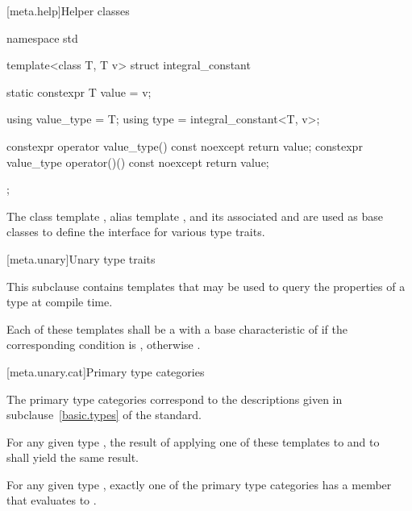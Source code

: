 [meta.help]{Helper classes}

%
\begin{indexed}{}
\begin{codeblock}
namespace std {
  template<class T, T v> struct integral_constant {
    static constexpr T value = v;

    using value_type = T;
    using type = integral_constant<T, v>;

    constexpr operator value_type() const noexcept { return value; }
    constexpr value_type operator()() const noexcept { return value; }
  };
}
\end{codeblock}
\end{indexed}

%
%
%
%
\pnum
The class template ,
alias template , and
its associated 
 and 
are used as base classes to define
the interface for various type traits.

[meta.unary]{Unary type traits}

\pnum
This subclause contains templates that may be used to query the
properties of a type at compile time.

\pnum
Each of these templates shall be a
with a base characteristic of
 if the corresponding condition is , otherwise
.

[meta.unary.cat]{Primary type categories}

\pnum
The primary type categories correspond to the descriptions given in
subclause~\ref{basic.types} of the \Cpp{} standard.

\pnum
For any given type , the result of applying one of these templates to
 and to \cv{}~ shall yield the same result.

\pnum
\begin{note}
For any given type , exactly one of the primary type categories
has a  member that evaluates to .
\end{note}

